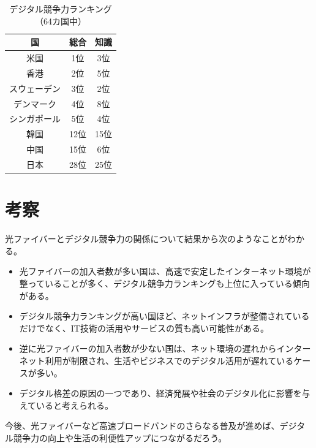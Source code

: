 \documentclass[a4paper,11pt,dvipdfmx]{ujarticle}
\begin{document}
\begin{table}[H]
  \centering
  \caption{デジタル競争力ランキング（64カ国中）}
  \label{tab:ranking}
  \begin{tabular}{|c|c|c|}
    \hline
    国 & 総合 & 知識 \\
    \hline
    米国 & 1位 & 3位 \\
    \hline
    香港 & 2位 & 5位 \\
    \hline
    スウェーデン & 3位 & 2位 \\
    \hline
    デンマーク & 4位 & 8位 \\
    \hline
    シンガポール & 5位 & 4位 \\
    \hline
    \hline
    韓国 & 12位 & 15位 \\
    \hline
    中国 & 15位 & 6位 \\
    \hline
    \hline
    日本 & 28位 & 25位 \\
    \hline

  \end{tabular}
\end{table}

\section{考察}
光ファイバーとデジタル競争力の関係について結果\cite{imd}から次のようなことがわかる。
\begin{itemize}
 \item 光ファイバーの加入者数が多い国は、高速で安定したインターネット環境が整っていることが多く、デジタル競争力ランキングも上位に入っている傾向がある。
 \item デジタル競争力ランキングが高い国ほど、ネットインフラが整備されているだけでなく、IT技術の活用やサービスの質も高い可能性がある。
 \item 逆に光ファイバーの加入者数が少ない国は、ネット環境の遅れからインターネット利用が制限され、生活やビジネスでのデジタル活用が遅れているケースが多い。
 \item デジタル格差の原因の一つであり、経済発展や社会のデジタル化に影響を与えていると考えられる。
\end{itemize}
今後、光ファイバーなど高速ブロードバンドのさらなる普及が進めば、デジタル競争力の向上や生活の利便性アップにつながるだろう。



\end{document}
